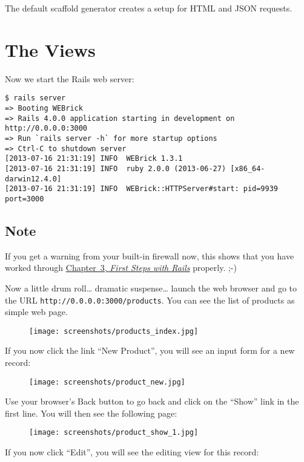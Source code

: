 \documentclass[a4paper]{book}
\newcommand{\chap}[1]{\newpage\thispagestyle{empty}\chapter{#1}\label{chap:\thechapter}}
\begin{document}
The default scaffold generator creates a setup for HTML and JSON requests.

\chap{The Views}\label{the-views}

Now we start the Rails web server:

\begin{shaded}\begin{verbatim}
$ rails server
=> Booting WEBrick
=> Rails 4.0.0 application starting in development on http://0.0.0.0:3000
=> Run `rails server -h` for more startup options
=> Ctrl-C to shutdown server
[2013-07-16 21:31:19] INFO  WEBrick 1.3.1
[2013-07-16 21:31:19] INFO  ruby 2.0.0 (2013-06-27) [x86_64-darwin12.4.0]
[2013-07-16 21:31:19] INFO  WEBrick::HTTPServer#start: pid=9939 port=3000
\end{verbatim}\end{shaded}

\section{Note}\label{note-33}

If you get a warning from your built-in firewall now, this shows that you have worked through \hyperref[ersteux5fschritteux5fmitux5frails]{Chapter~3, \emph{First Steps with Rails}} properly. ;-)

Now a little drum roll\ldots{} dramatic suspense\ldots{} launch the web browser and go to the URL \texttt{http://0.0.0.0:3000/products}. You can see the list of products as simple web page.

\begin{figure}[htbp]
\centering
\texttt{[image: screenshots/products\_index.jpg]}
\end{figure}

If you now click the link “New Product”, you will see an input form for a new record:

\begin{figure}[htbp]
\centering
\texttt{[image: screenshots/product\_new.jpg]}
\end{figure}

Use your browser's Back button to go back and click on the “Show” link in the first line. You will then see the following page:

\begin{figure}[htbp]
\centering
\texttt{[image: screenshots/product\_show\_1.jpg]}
\end{figure}

If you now click “Edit”, you will see the editing view for this record:
\end{document}
